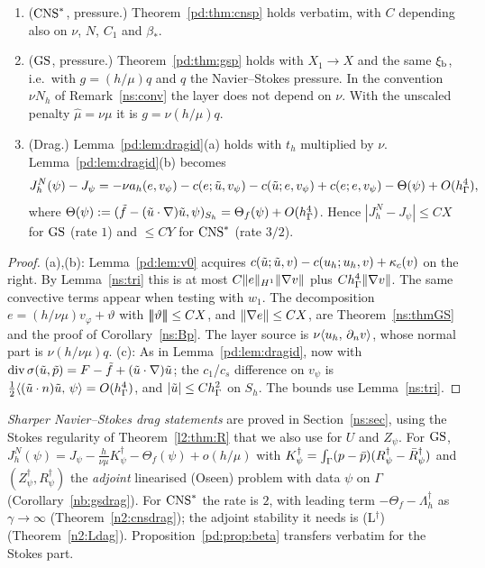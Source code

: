 \begin{proposition}\label{pd:prop:ns}
\begin{enumerate}[label=(\alph*)]
\item ($\mathrm{CNS}^\ast$, pressure.) Theorem~\ref{pd:thm:cnsp} holds verbatim, with $C$ depending also on $\nu$, $N$, $C_1$ and $\beta_\ast$.
\item ($\mathrm{GS}$, pressure.) Theorem~\ref{pd:thm:gsp} holds with $X_1\to X$ and the same $\xi_{\mathrm b}$, i.e.\ with $g=(h/\mu)q$ and $q$ the Navier--Stokes pressure. In the convention $\nu N_h$ of Remark~\ref{ns:conv} the layer does not depend on $\nu$. With the unscaled penalty $\hat\mu=\nu\mu$ it is $g=\nu(h/\hat\mu)q$.
\item (Drag.) Lemma~\ref{pd:lem:dragid}(a) holds with $t_h$ multiplied by $\nu$. Lemma~\ref{pd:lem:dragid}(b) becomes
\[
J^N_h(\psi)-J_\psi=-\nu a_h(e,v_\psi)-c(e;\tilde u,v_\psi)-c(\tilde u;e,v_\psi)+c(e;e,v_\psi)-\Theta(\psi)+O(h_\Gamma^4),
\]
where $\Theta(\psi):=(\tilde f-(\tilde u\cdot\nabla)\tilde u,\psi)_{S_h}=\Theta_f(\psi)+O(h_\Gamma^4)$. Hence $|J^N_h-J_\psi|\le CX$ for $\mathrm{GS}$ (rate $1$) and $\le CY$ for $\mathrm{CNS}^\ast$ (rate $3/2$).
\end{enumerate}
\end{proposition}

\begin{proof}
(a),(b): Lemma~\ref{pd:lem:v0} acquires $c(\tilde u;\tilde u,v)-c(u_h;u_h,v)+\kappa_c(v)$ on the right. By Lemma~\ref{ns:tri} this is at most $C\lVert e\rVert_{H^1}\lVert \nabla v\rVert$ plus $Ch_\Gamma^4\lVert \nabla v\rVert$. The same convective terms appear when testing with $w_1$. The decomposition $e=(h/\nu\mu)v_\varphi+\vartheta$ with $|\!|\!|\vartheta|\!|\!|\le CX$, and $\lVert \nabla e\rVert\le CX$, are Theorem~\ref{ns:thmGS} and the proof of Corollary~\ref{ns:Bp}. The layer source is $\nu\langle u_h,\, \partial_n v\rangle$, whose normal part is $\nu(h/\nu\mu)q$. (c): As in Lemma~\ref{pd:lem:dragid}, now with $\operatorname{div}\sigma(\tilde u,\tilde p)=F-\tilde f+(\tilde u\cdot\nabla)\tilde u$; the $c_1$/$c_s$ difference on $v_\psi$ is $\frac12\langle (\tilde u\cdot n)\tilde u,\, \psi\rangle=O(h_\Gamma^4)$, and $|\tilde u|\le Ch_\Gamma^2$ on $S_h$. The bounds use Lemma~\ref{ns:tri}.
\end{proof}

\emph{Sharper Navier--Stokes drag statements} are proved in Section~\ref{ns:sec}, using the Stokes regularity of Theorem~\ref{l2:thm:R} that we also use for $U$ and $Z_\psi$. For $\mathrm{GS}$, $J^N_h(\psi)=J_\psi-\frac h{\nu\mu}K^\dagger_\psi-\Theta_f(\psi)+o(h/\mu)$ with $K^\dagger_\psi=\int_\Gamma(p-\bar p)(R^\dagger_\psi-\bar R^\dagger_\psi)$ and $(Z^\dagger_\psi,R^\dagger_\psi)$ the \emph{adjoint} linearised (Oseen) problem with data $\psi$ on $\Gamma$ (Corollary~\ref{nb:gsdrag}). For $\mathrm{CNS}^\ast$ the rate is $2$, with leading term $-\Theta_f-\Lambda^\dagger_h$ as $\gamma\to\infty$ (Theorem~\ref{n2:cnsdrag}); the adjoint stability it needs is (L$^\dagger$) (Theorem~\ref{n2:Ldag}). Proposition~\ref{pd:prop:beta} transfers verbatim for the Stokes part.

